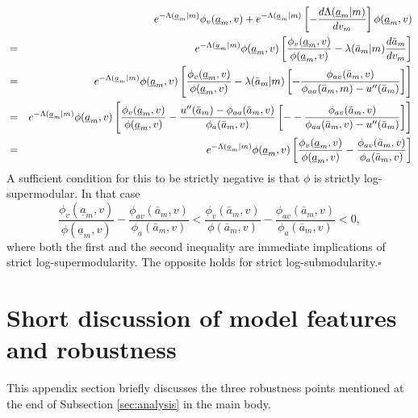 \documentclass[12pt]{article}
\theoremstyle{plain}
\begin{document}
\begin{eqnarray*}
&&e^{-\Lambda (\underline{a}_{m}|m)}\phi _{v}(\underline{a}%
_{m},v)+e^{-\Lambda (\underline{a}_{m}|m)}\left[ -\frac{d\Lambda (\underline{%
a}_{m}|m)}{dv_{m}}\right] \phi (\underline{a}_{m},v) \\
&=&e^{-\Lambda (\underline{a}_{m}|m)}\phi (\underline{a}_{m},v)\left[ \frac{%
\phi _{v}(\underline{a}_{m},v)}{\phi (\underline{a}_{m},v)}-\lambda (\bar{a}%
_{m}|m)\frac{d\bar{a}_{m}}{dv_{m}}\right] \\
&=&e^{-\Lambda (\underline{a}_{m}|m)}\phi (\underline{a}_{m},v)\left[ \frac{%
\phi _{v}(\underline{a}_{m},v)}{\phi (\underline{a}_{m},v)}-\lambda (\bar{a}%
_{m}|m)\left[ -\frac{\phi _{av}(\bar{a}_{m},v)}{\phi _{aa}(\bar{a}%
_{m},m)-u^{\prime \prime }(\bar{a}_{m})}\right] \right] \\
&=&e^{-\Lambda (\underline{a}_{m}|m)}\phi (\underline{a}_{m},v)\left[ \frac{%
\phi _{v}(\underline{a}_{m},v)}{\phi (\underline{a}_{m},v)}-\frac{u^{\prime
\prime }(\bar{a}_{m})-\phi _{aa}(\bar{a}_{m},v)}{\phi _{a}(\bar{a}_{m},v)}%
\left[ --\frac{\phi _{av}(\bar{a}_{m},v)}{\phi _{aa}(\bar{a}%
_{m},v)-u^{\prime \prime }(\bar{a}_{m})}\right] \right] \\
&=&e^{-\Lambda (\underline{a}_{m}|m)}\phi (\underline{a}_{m},v)\left[ \frac{%
\phi _{v}(\underline{a}_{m},v)}{\phi (\underline{a}_{m},v)}-\frac{\phi _{av}(%
\bar{a}_{m},v)}{\phi _{a}(\bar{a}_{m},v)}\right]
\end{eqnarray*}%
A sufficient condition for this to be strictly negative is that $\phi $ is
strictly log-supermodular. In that case 
\begin{equation*}
\frac{\phi _{v}(\underline{a}_{m},v)}{\phi (\underline{a}_{m},v)}-\frac{\phi
_{av}(\bar{a}_{m},v)}{\phi _{a}(\bar{a}_{m},v)}<\frac{\phi _{v}(\bar{a}%
_{m},v)}{\phi (\bar{a}_{m},v)}-\frac{\phi _{av}(\bar{a}_{m},v)}{\phi _{a}(%
\bar{a}_{m},v)}<0,
\end{equation*}%
where both the first and the second inequality are immediate implications of
strict log-supermodularity. The opposite holds for strict log-submodularity.$%
\square $

\bigskip

\section{Short discussion of model features and robustness}\label{sec:app-discussion}

This appendix section briefly discusses the three robustness points mentioned at the end of Subsection \ref{sec:analysis} in the main body. \bigskip
\end{document}
